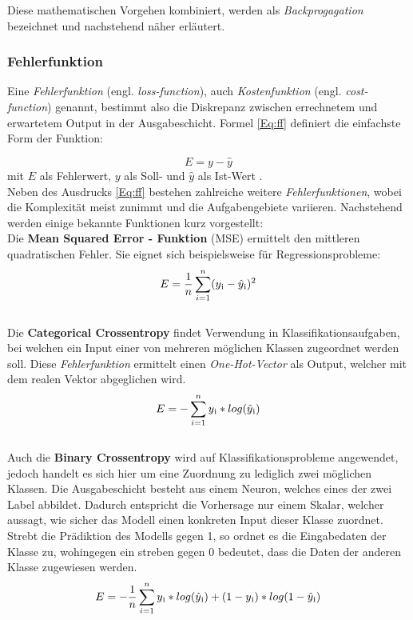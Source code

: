 Diese mathematischen Vorgehen kombiniert, werden als \textit{Backprogagation} bezeichnet und nachstehend näher erläutert. \cite[vgl.][]{20}

\subsubsection{Fehlerfunktion} 
\label{Fehlerfunktion}
Eine \textit{Fehlerfunktion} (engl. \textit{loss-function}), auch \textit{Kostenfunktion} (engl. \textit{cost-function}) genannt, bestimmt also die \glqq Diskrepanz zwischen errechnetem und erwartetem Output\grqq{} \cite[S. 77]{12} in der Ausgabeschicht. Formel \ref{Eq:ff} definiert die einfachste Form der Funktion:

\begin{equation} \label{Eq:ff}
	E = y - \hat{y}
\end{equation}
mit $E$ als Fehlerwert, $y$ als Soll- und $\hat{y}$ als Ist-Wert \cite[vgl.][S. 161]{13}.
\\ 

Neben des Ausdrucks \ref{Eq:ff} bestehen zahlreiche weitere \textit{Fehlerfunktionen}, wobei die Komplexität meist zunimmt und die Aufgabengebiete variieren. Nachstehend werden einige bekannte Funktionen kurz vorgestellt:\\

Die \textbf{Mean Squared Error - Funktion} (MSE) ermittelt den mittleren quadratischen Fehler. Sie eignet sich beispielsweise für Regressionsprobleme:
\begin{equation} 
	E = \frac{1}{n} \sum_{i=1}^{n} (y\textsubscript{i} - \hat{y}\textsubscript{i})^{2}
\end{equation}
\cite[vgl.][S. 76 f.]{12} \\

Die \textbf{Categorical Crossentropy} findet Verwendung in Klassifikationsaufgaben, bei welchen ein Input einer von mehreren möglichen Klassen zugeordnet werden soll. Diese \textit{Fehlerfunktion} ermittelt einen \textit{One-Hot-Vector} als Output, welcher mit dem realen Vektor abgeglichen wird. \cite[vgl.][]{10, 12}
\begin{equation} 
	E = - \sum_{i=1}^{n} y\textsubscript{i} * log(\hat{y}\textsubscript{i}) 
\end{equation}
\cite[vgl.][]{23} \\


Auch die \textbf{Binary Crossentropy} wird auf Klassifikationsprobleme angewendet, jedoch handelt es sich hier um eine Zuordnung zu lediglich zwei möglichen Klassen. Die Ausgabeschicht besteht aus einem Neuron, welches eines der zwei Label abbildet. Dadurch entspricht die Vorhersage nur einem Skalar, welcher aussagt, wie sicher das Modell einen konkreten Input dieser Klasse zuordnet. 
Strebt die Prädiktion des Modells gegen 1, so ordnet es die Eingabedaten der Klasse zu, wohingegen ein streben gegen 0 bedeutet, dass die Daten der anderen Klasse zugewiesen werden. 
\begin{equation} 
	E = -\frac{1}{n} \sum_{i=1}^{n} y\textsubscript{i} * log(\hat{y}\textsubscript{i}) + (1-y\textsubscript{i}) * log(1-\hat{y}\textsubscript{i})
\end{equation}
\cite[vgl.][]{22} \\

